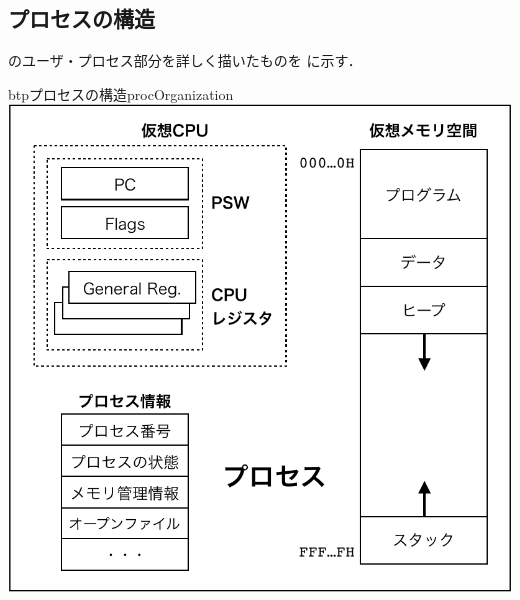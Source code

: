 \subsection{プロセスの構造}
のユーザ・プロセス部分を詳しく描いたものを
に示す．

\begin{myfig}{btp}{プロセスの構造}{procOrganization}
  \includegraphics[scale=0.66]{Fig/procOrganization-crop.pdf}
\end{myfig}

